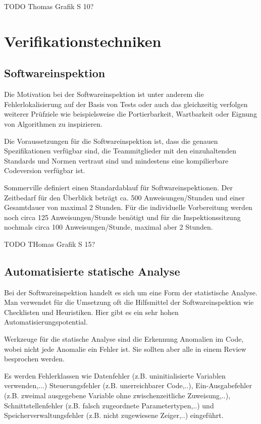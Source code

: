 TODO Thomas Grafik S 10?

\chapter{Verifikationstechniken}
\section{Softwareinspektion}
Die Motivation bei der Softwareinspektion ist unter anderem die Fehlerlokalisierung auf der Basis von Tests oder auch das gleichzeitig verfolgen weiterer Prüfziele wie beispielsweise die Portierbarkeit, Wartbarkeit oder Eignung von Algorithmen zu inspizieren. 

Die Voraussetzungen für die Softwareinspektion ist, dass die genauen Spezifikationen verfügbar sind, die Teammitglieder mit den einzuhaltenden Standards und Normen vertraut sind und mindestens eine kompilierbare Codeversion verfügbar ist. 

Sommerville definiert einen Standardablauf für Softwareinspektionen. Der Zeitbedarf für den Überblick beträgt ca. 500 Anweisungen/Stunden und einer Gesamtdauer von maximal 2 Stunden. Für die individuelle Vorbereitung werden noch circa 125 Anweisungen/Stunde benötigt und für die Inspektionssitzung nochmals circa 100 Anweisungen/Stunde, maximal aber 2 Stunden.

TODO THomas Grafik S 15?


\section{Automatisierte statische Analyse}
Bei der Softwareinspektion handelt es sich um eine Form der statistische Analyse. Man verwendet für die Umsetzung oft die Hilfsmittel der Softwareinspektion wie Checklisten und Heuristiken. Hier gibt es ein sehr hohen Automatisierungspotential. 

Werkzeuge für die statische Analyse sind die Erkennung Anomalien im Code, wobei nicht jede Anomalie ein Fehler ist. Sie sollten aber alle in einem Review besprochen werden.

Es werden Fehlerklassen wie Datenfehler (z.B. uninitialisierte Variablen verwenden,...) Steuerungsfehler (z.B. unerreichbarer Code,..), Ein-Ausgabefehler (z.B. zweimal ausgegebene Variable ohne zwischenzeitliche Zuweisung,..), Schnittstellenfehler (z.B. falsch zugeordnete Parametertypen,..) und Speicherverwaltungsfehler (z.B. nicht zugewiesene Zeiger,..) eingeführt.

